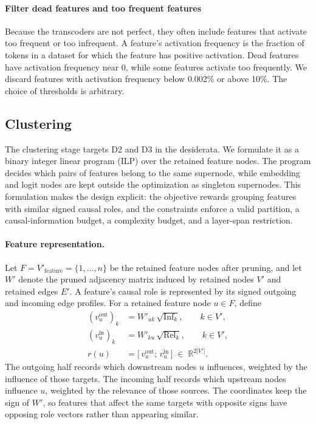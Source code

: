 \documentclass[../main.tex]{subfiles}
\begin{document}
\paragraph{Filter dead features and too frequent features}
Because the transcoders are not perfect, they often include features that activate too frequent or too infrequent.
A feature's activation frequency is the fraction of tokens in a dataset for which
the feature has positive activation. Dead features have activation frequency near
0, while some features activate too frequently. We discard features with
activation frequency below 0.002\% or above 10\%. The choice of thresholds is arbitrary.

\subsection{Clustering}
\label{sec:stage2}
The clustering stage targets D2 and D3 in the desiderata. We formulate it as a binary integer linear program (ILP)
over the retained feature nodes. The program decides which pairs of features
belong to the same supernode, while embedding and logit nodes are kept outside the
optimization as singleton supernodes. This formulation makes the design explicit:
the objective rewards grouping features with similar signed causal roles, and the
constraints enforce a valid partition, a causal-information budget, a complexity
budget, and a layer-span restriction.

\paragraph{Feature representation.}
Let $F = V'_{\text{feature}} = \{1,\dots,n\}$ be the retained feature nodes after
pruning, and let $W'$ denote the pruned adjacency matrix induced by retained
nodes $V'$ and retained edges $E'$. A feature's causal role is represented by
its signed outgoing and incoming edge profiles. For a retained feature node
$u \in F$, define
\begin{align}
(v_u^{\text{out}})_k &= W'_{uk}\,\sqrt{\mathrm{Inf}_k},
\qquad k \in V', \nonumber\\
(v_u^{\text{in}})_k &= W'_{ku}\,\sqrt{\mathrm{Rel}_k},
\qquad k \in V', \nonumber\\
r(u) &= \bigl[\,v_u^{\text{out}};\,v_u^{\text{in}}\,\bigr]
\;\in\; \mathbb{R}^{2|V'|}. \label{eq:role}
\end{align}
The outgoing half records which downstream nodes $u$ influences, weighted by the
influence of those targets. The incoming half records which upstream nodes
influence $u$, weighted by the relevance of those sources. The coordinates keep
the sign of $W'$, so features that affect the same targets with opposite signs have
opposing role vectors rather than appearing similar.
\end{document}
